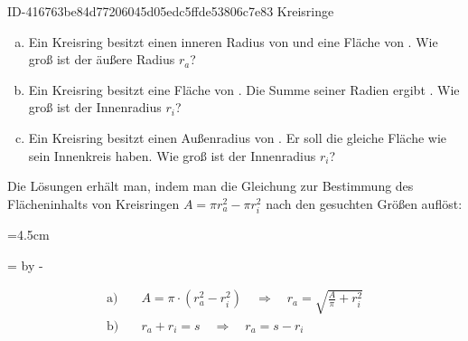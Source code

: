 \begin{exercise}
      {ID-416763be84d77206045d05edc5ffde53806c7e83}
      {Kreisringe}
  \ifproblem\problem\par
    \begin{enumerate}[a)]
      \item Ein Kreisring besitzt einen inneren Radius von  und eine
            Fläche von . Wie groß ist der äußere Radius $r_{a}$?
      \item Ein Kreisring besitzt eine Fläche von . Die Summe
            seiner Radien ergibt . Wie groß ist der Innenradius
            $r_{i}$?
      \item Ein Kreisring besitzt einen Außenradius von . Er soll
            die gleiche Fläche wie sein Innenkreis haben. Wie groß ist der
            Innenradius $r_{i}$?
    \end{enumerate}
  \fi
  \ifoutline\outline\par
    Die Lösungen erhält man, indem man die Gleichung zur Bestimmung des
    Flächeninhalts von Kreisringen $A=\pi r_a^2-\pi r_i^2$ nach den
    gesuchten Größen auflöst:\par
    \begingroup
      =4.5cm%
      \begin{minipage}{\dimen1}%
      \end{minipage}%
      =\linewidth%
      \advance{} by -%
      \begin{minipage}{\dimen2}%
        \setlength{\abovedisplayskip}{0pt}%
        \begin{equation*}
          \begin{split}
            \text{a)}&\quad
            A=\pi\cdot\left(r_a^2-r_i^2\right)
            \quad\Rightarrow\quad
            r_a=\sqrt{\frac{A}{\pi}+r_i^2}
            \\[2ex]
            \text{b)}&\quad
            r_a+r_i=s
            \quad\Rightarrow\quad
            r_a=s-r_i
            \\
            \text{~}&\quad

\end{split}
\end{equation*}
\end{minipage}
\end{exercise}
